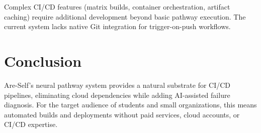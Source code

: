 \documentclass[man,12pt,floatsintext]{apa7}
\begin{document}
Complex CI/CD features (matrix builds, container orchestration, artifact caching) require
additional development beyond basic pathway execution. The current system lacks native
Git integration for trigger-on-push workflows.

\section{Conclusion}

Are-Self's neural pathway system provides a natural substrate for CI/CD pipelines,
eliminating cloud dependencies while adding AI-assisted failure diagnosis. For the
target audience of students and small organizations, this means automated builds and
deployments without paid services, cloud accounts, or CI/CD expertise.

\printbibliography
\end{document}
